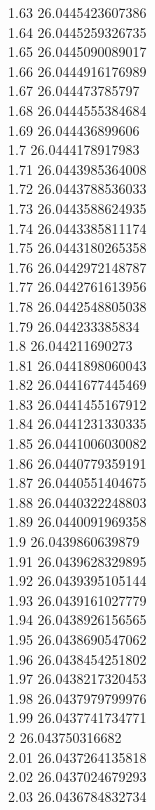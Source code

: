 {1.63	26.0445423607386\\
1.64	26.0445259326735\\
1.65	26.0445090089017\\
1.66	26.0444916176989\\
1.67	26.044473785797\\
1.68	26.0444555384684\\
1.69	26.044436899606\\
1.7	26.0444178917983\\
1.71	26.0443985364008\\
1.72	26.0443788536033\\
1.73	26.0443588624935\\
1.74	26.0443385811174\\
1.75	26.0443180265358\\
1.76	26.0442972148787\\
1.77	26.0442761613956\\
1.78	26.0442548805038\\
1.79	26.044233385834\\
1.8	26.044211690273\\
1.81	26.0441898060043\\
1.82	26.0441677445469\\
1.83	26.0441455167912\\
1.84	26.0441231330335\\
1.85	26.0441006030082\\
1.86	26.0440779359191\\
1.87	26.0440551404675\\
1.88	26.0440322248803\\
1.89	26.0440091969358\\
1.9	26.0439860639879\\
1.91	26.0439628329895\\
1.92	26.0439395105144\\
1.93	26.0439161027779\\
1.94	26.0438926156565\\
1.95	26.0438690547062\\
1.96	26.0438454251802\\
1.97	26.0438217320453\\
1.98	26.0437979799976\\
1.99	26.0437741734771\\
2	26.043750316682\\
2.01	26.0437264135818\\
2.02	26.0437024679293\\
2.03	26.0436784832734\\
}
